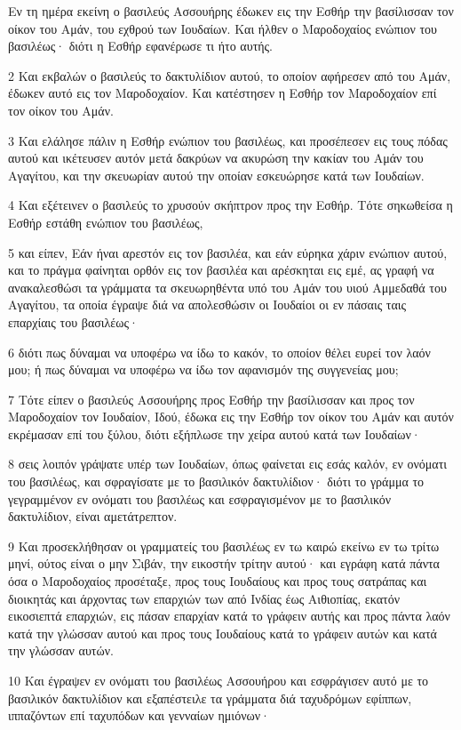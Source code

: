 \par Εν τη ημέρα εκείνη ο βασιλεύς Ασσουήρης έδωκεν εις την Εσθήρ την βασίλισσαν τον οίκον του Αμάν, του εχθρού των Ιουδαίων. Και ήλθεν ο Μαροδοχαίος ενώπιον του βασιλέως· διότι η Εσθήρ εφανέρωσε τι ήτο αυτής.
\par 2 Και εκβαλών ο βασιλεύς το δακτυλίδιον αυτού, το οποίον αφήρεσεν από του Αμάν, έδωκεν αυτό εις τον Μαροδοχαίον. Και κατέστησεν η Εσθήρ τον Μαροδοχαίον επί τον οίκον του Αμάν.
\par 3 Και ελάλησε πάλιν η Εσθήρ ενώπιον του βασιλέως, και προσέπεσεν εις τους πόδας αυτού και ικέτευσεν αυτόν μετά δακρύων να ακυρώση την κακίαν του Αμάν του Αγαγίτου, και την σκευωρίαν αυτού την οποίαν εσκευώρησε κατά των Ιουδαίων.
\par 4 Και εξέτεινεν ο βασιλεύς το χρυσούν σκήπτρον προς την Εσθήρ. Τότε σηκωθείσα η Εσθήρ εστάθη ενώπιον του βασιλέως,
\par 5 και είπεν, Εάν ήναι αρεστόν εις τον βασιλέα, και εάν εύρηκα χάριν ενώπιον αυτού, και το πράγμα φαίνηται ορθόν εις τον βασιλέα και αρέσκηται εις εμέ, ας γραφή να ανακαλεσθώσι τα γράμματα τα σκευωρηθέντα υπό του Αμάν του υιού Αμμεδαθά του Αγαγίτου, τα οποία έγραψε διά να απολεσθώσιν οι Ιουδαίοι οι εν πάσαις ταις επαρχίαις του βασιλέως·
\par 6 διότι πως δύναμαι να υποφέρω να ίδω το κακόν, το οποίον θέλει ευρεί τον λαόν μου; ή πως δύναμαι να υποφέρω να ίδω τον αφανισμόν της συγγενείας μου;
\par 7 Τότε είπεν ο βασιλεύς Ασσουήρης προς Εσθήρ την βασίλισσαν και προς τον Μαροδοχαίον τον Ιουδαίον, Ιδού, έδωκα εις την Εσθήρ τον οίκον του Αμάν και αυτόν εκρέμασαν επί του ξύλου, διότι εξήπλωσε την χείρα αυτού κατά των Ιουδαίων·
\par 8 σεις λοιπόν γράψατε υπέρ των Ιουδαίων, όπως φαίνεται εις εσάς καλόν, εν ονόματι του βασιλέως, και σφραγίσατε με το βασιλικόν δακτυλίδιον· διότι το γράμμα το γεγραμμένον εν ονόματι του βασιλέως και εσφραγισμένον με το βασιλικόν δακτυλίδιον, είναι αμετάτρεπτον.
\par 9 Και προσεκλήθησαν οι γραμματείς του βασιλέως εν τω καιρώ εκείνω εν τω τρίτω μηνί, ούτος είναι ο μην Σιβάν, την εικοστήν τρίτην αυτού· και εγράφη κατά πάντα όσα ο Μαροδοχαίος προσέταξε, προς τους Ιουδαίους και προς τους σατράπας και διοικητάς και άρχοντας των επαρχιών των από Ινδίας έως Αιθιοπίας, εκατόν εικοσιεπτά επαρχιών, εις πάσαν επαρχίαν κατά το γράφειν αυτής και προς πάντα λαόν κατά την γλώσσαν αυτού και προς τους Ιουδαίους κατά το γράφειν αυτών και κατά την γλώσσαν αυτών.
\par 10 Και έγραψεν εν ονόματι του βασιλέως Ασσουήρου και εσφράγισεν αυτό με το βασιλικόν δακτυλίδιον και εξαπέστειλε τα γράμματα διά ταχυδρόμων εφίππων, ιππαζόντων επί ταχυπόδων και γενναίων ημιόνων·
